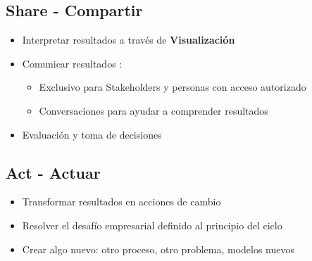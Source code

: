 \subsection{Share - Compartir}
\begin{itemize}
    \item {Interpretar resultados a través de \textbf{Visualización}}
    \item {Comunicar resultados : 
    \begin{itemize}
        \item {Exclusivo para Stakeholders y personas con acceso autorizado}
        \item {Conversaciones para ayudar a comprender resultados}
    \end{itemize}}
    \item {Evaluación y toma de decisiones}
\end{itemize}

\subsection{Act - Actuar}
\begin{itemize}
    \item {Transformar resultados en acciones de cambio}
    \item {Resolver el desafío empresarial definido al principio del ciclo}
    \item {Crear algo nuevo: otro proceso, otro problema, modelos nuevos}
\end{itemize}

\newpage